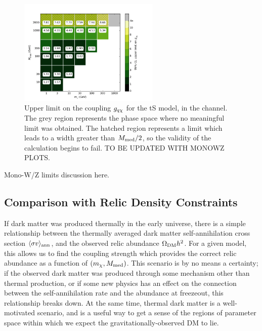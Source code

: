 \begin{figure}[!h]
  \centering
    \includegraphics[width=0.6\textwidth]{figures/grid_allpoints_TSD_rat1.png}
    \caption{Upper limit on the coupling $g_{q \chi}$ for the tS model, in the \monoWZ channel. The grey region represents the phase space where no meaningful limit was obtained. The hatched region represents a limit which leads to a width greater than $M_{\mathrm{med}} / 2$, so the validity of the calculation begins to fail. TO BE UPDATED WITH MONOWZ PLOTS.}
    \label{fig:MonoWZ_TSD_couplinglimit}
\end{figure}

Mono-W/Z limits discussion here.

\subsection{Comparison with Relic Density Constraints}


If dark matter was produced thermally in the early universe, there is a simple relationship between the thermally averaged dark matter self-annihilation cross section $\langle\sigma v\rangle_{\rm ann}$, and the observed relic abundance $\Omega_{\rm DM}h^2$. For a given model, this allows us to find the coupling strength which provides the correct relic abundance as a function of $(m_{\chi}, M_{\mathrm{med}})$.
%
This scenario is by no means a certainty; if the observed dark matter was produced through some mechanism other than thermal production, or if some new physics has an effect on the connection between the self-annihilation rate and the abundance at freezeout, this relationship breaks down. At the same time, thermal dark matter is a well-motivated scenario, and is a useful way to get a sense of the regions of parameter space within which we expect the gravitationally-observed DM to lie.

